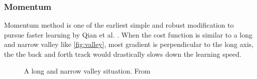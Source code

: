 \subsubsection{Momentum}
Momentum method is one of the earliest simple and robust modification to
pursue faster learning by Qian et al. \parencite{qian1999momentum}. 
When the cost function is similar to a long and 
narrow valley like \autoref{fig:valley}, most gradient is perpendicular
to the long axis, the the back and forth track would drastically slows 
down the learning speed. 

\begin{figure}[H]
    \centering
    \centering
    \caption{\label{fig:valley}A long and narrow valley 
    situation. From \parencite{momentum}}
\end{figure}

